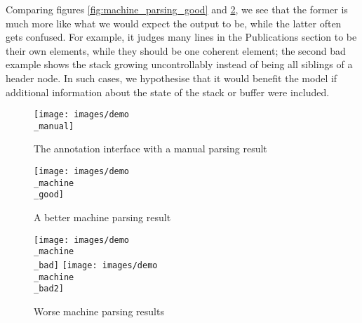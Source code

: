 \documentclass[11pt]{article}
\begin{document}
Comparing figures \ref{fig:machine_parsing_good} and \ref{fig:machine_parsing_bad}, we see that the former is much more like what we would expect the output to be, while the latter often gets confused. For example, it judges many lines in the Publications section to be their own elements, while they should be one coherent element; the second bad example shows the stack growing uncontrollably instead of being all siblings of a header node. In such cases, we hypothesise that it would benefit the model if additional information about the state of the stack or buffer were included. 

\begin{figure}[h!]
	\centering
	\texttt{[image: images/demo\\\_manual]}
	\caption{The annotation interface with a manual parsing result}
	\label{fig:human_annotation}
\end{figure}

\begin{figure}[h!]
	\centering
	\texttt{[image: images/demo\\\_machine\\\_good]}
	\caption{A better machine parsing result}
	\label{fig:machine_parsing_good}
	\texttt{[image: images/demo\\\_machine\\\_bad]}
	\texttt{[image: images/demo\\\_machine\\\_bad2]}
	\caption{Worse machine parsing results}
	\label{fig:machine_parsing_bad}
	
\end{figure}
\end{document}
